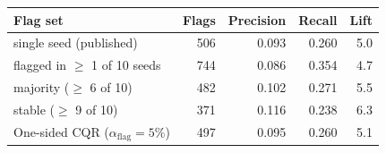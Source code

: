 \begin{tabular}{lrrrr}\toprule
Flag set & Flags & Precision & Recall & Lift\\\midrule
single seed (published) & 506 & 0.093 & 0.260 & 5.0\\
flagged in $\geq$ 1 of 10 seeds & 744 & 0.086 & 0.354 & 4.7\\
majority ($\geq$ 6 of 10) & 482 & 0.102 & 0.271 & 5.5\\
stable ($\geq$ 9 of 10) & 371 & 0.116 & 0.238 & 6.3\\
One-sided CQR ($\alpha_{\mathrm{flag}}=5\%$) & 497 & 0.095 & 0.260 & 5.1\\
\bottomrule\end{tabular}
